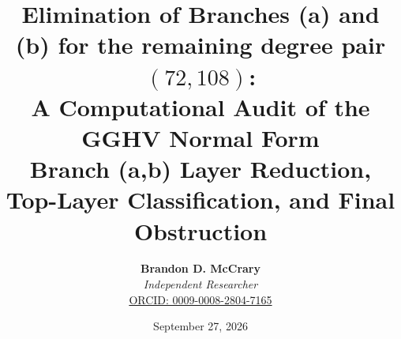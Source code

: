 \documentclass[a4paper,11pt]{article}
\theoremstyle{plain}
\theoremstyle{definition}
\theoremstyle{remark}
\begin{document}
\title{\textbf{\Large Elimination of Branches (a) and (b) for the remaining degree pair $(72,108)$:}\\[0.6em]
\large A Computational Audit of the GGHV Normal Form\\[0.4em]
\normalsize Branch (a,b) Layer Reduction, Top-Layer Classification, and Final Obstruction}
\author{\textbf{Brandon D. McCrary}\\[0.25em]
\textit{Independent Researcher}\\[0.25em]
\href{https://orcid.org/0009-0008-2804-7165}{ORCID: 0009-0008-2804-7165}\\[0.6em]
{\small \parbox{0.92\textwidth}{}}}
\date{September 27, 2026}
\maketitle
\end{document}
